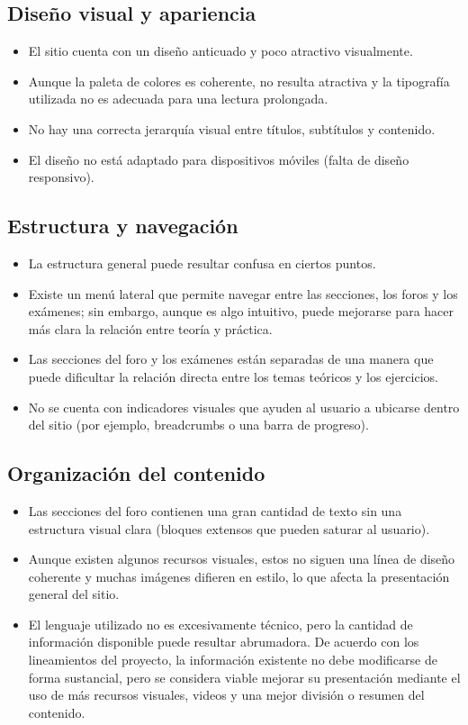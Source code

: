 \documentclass[11pt,a4paper]{article}
\begin{document}
\subsection{Dise\~no visual y apariencia}
\begin{itemize}[left=0pt,labelsep=5pt]
    \item El sitio cuenta con un dise\~no anticuado y poco atractivo visualmente.
    \item Aunque la paleta de colores es coherente, no resulta atractiva y la tipograf\'ia utilizada no es adecuada para una lectura prolongada.
    \item No hay una correcta jerarqu\'ia visual entre t\'itulos, subt\'itulos y contenido.
    \item El dise\~no no est\'a adaptado para dispositivos m\'oviles (falta de dise\~no responsivo).
\end{itemize}

\subsection{Estructura y navegaci\'on}
\begin{itemize}[left=0pt,labelsep=5pt]
    \item La estructura general puede resultar confusa en ciertos puntos.
    \item Existe un men\'u lateral que permite navegar entre las secciones, los foros y los ex\'amenes; sin embargo, aunque es algo intuitivo, puede mejorarse para hacer m\'as clara la relaci\'on entre teor\'ia y pr\'actica.
    \item Las secciones del foro y los ex\'amenes est\'an separadas de una manera que puede dificultar la relaci\'on directa entre los temas te\'oricos y los ejercicios.
    \item No se cuenta con indicadores visuales que ayuden al usuario a ubicarse dentro del sitio (por ejemplo, breadcrumbs o una barra de progreso).
\end{itemize}

\subsection{Organizaci\'on del contenido}
\begin{itemize}[left=0pt,labelsep=5pt]
    \item Las secciones del foro contienen una gran cantidad de texto sin una estructura visual clara (bloques extensos que pueden saturar al usuario).
    \item Aunque existen algunos recursos visuales, estos no siguen una l\'inea de dise\~no coherente y muchas im\'agenes difieren en estilo, lo que afecta la presentaci\'on general del sitio.
    \item El lenguaje utilizado no es excesivamente técnico, pero la cantidad de informaci\'on disponible puede resultar abrumadora. De acuerdo con los lineamientos del proyecto, la informaci\'on existente no debe modificarse de forma sustancial, pero se considera viable mejorar su presentaci\'on mediante el uso de m\'as recursos visuales, videos y una mejor divisi\'on o resumen del contenido.
\end{itemize}
\end{document}
